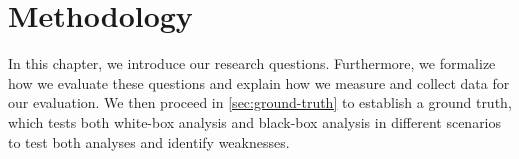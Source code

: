 \chapter{Methodology}\label{ch:methodology}

In this chapter, we introduce our research questions. 
Furthermore, we formalize how we evaluate these questions and explain how we measure and collect data for our evaluation.
We then proceed in \autoref{sec:ground-truth} to establish a ground truth, which tests both white-box analysis and black-box analysis in 
different scenarios to test both analyses and identify weaknesses.


